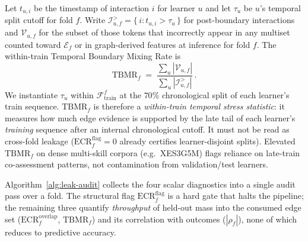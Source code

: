 \documentclass[pdflatex,sn-mathphys-num]{sn-jnl}
\newenvironment{revbox}{}{}
\begin{document}
Let $t_{u,i}$ be the timestamp of interaction $i$ for learner $u$ and
let $\tau_u$ be $u$'s temporal split cutoff for fold $f$. Write
$\mathcal{I}_{u,f}^{>}=\{\, i : t_{u,i}>\tau_u \,\}$ for post-boundary
interactions and $\mathcal{V}_{u,f}$ for the subset of those tokens that
incorrectly appear in any multiset counted toward $\mathcal{E}_f$ or in
graph-derived features at inference for fold $f$. The within-train
Temporal Boundary Mixing Rate is
\begin{equation}
\mathrm{TBMR}_f \;=\;
\frac{\sum_u |\mathcal{V}_{u,f}|}{\sum_u |\mathcal{I}_{u,f}^{>}|}\,.
\label{eq:tbvr}
\end{equation}
We instantiate $\tau_u$ within $\mathcal{F}_{\text{train}}^f$ at the
$70\%$ chronological split of each learner's train sequence.
$\mathrm{TBMR}_f$ is therefore a \emph{within-train temporal stress
statistic}: it measures how much edge evidence is supported by the late tail
of each learner's \emph{training} sequence after an internal chronological
cutoff. It must not be read as cross-fold leakage
($\mathrm{ECR}^{\mathrm{flag}}_f{=}0$ already certifies learner-disjoint
splits). Elevated $\mathrm{TBMR}_f$ on dense multi-skill corpora (e.g.\
XES3G5M) flags reliance on late-train co-assessment patterns, not contamination
from validation/test learners.

\begin{revbox}
Algorithm~\ref{alg:leak-audit} collects the four scalar diagnostics into a
single audit pass over a fold. The structural flag $\mathrm{ECR}^{\mathrm{flag}}_f$
is a hard gate that halts the pipeline; the remaining three quantify
\emph{throughput} of held-out mass into the consumed edge set
($\mathrm{ECR}^{\mathrm{overlap}}_f$, $\mathrm{TBMR}_f$) and its correlation
with outcomes ($|\rho_f|$), none of which reduces to predictive accuracy.
\end{revbox}
\end{document}

